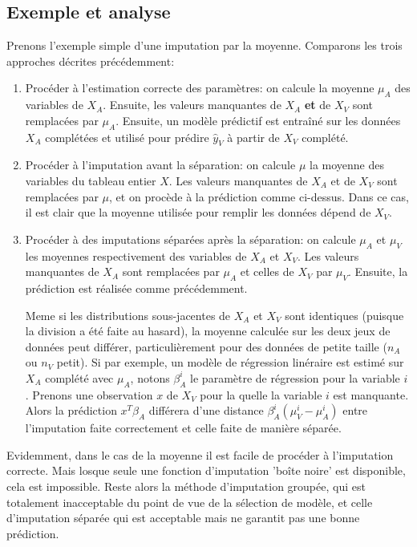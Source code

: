 \documentclass[12pt, a4paper]{article}
\begin{document}
\subsection{Exemple et analyse}
Prenons l'exemple simple d'une imputation par la moyenne. Comparons les trois approches décrites précédemment:
\begin{enumerate}
\item Procéder à l'estimation correcte des paramètres: on calcule la moyenne $\mu_A$ des variables de $X_A$. Ensuite, les valeurs manquantes de $X_A$ \textbf{et} de $X_V$ sont remplacées par $\mu_A$. Ensuite, un modèle prédictif est entraîné sur les données $X_A$ complétées et utilisé pour prédire $\hat{y}_V$ à partir de $X_V$ complété.

\item Procéder à l'imputation avant la séparation: on calcule $\mu$ la moyenne des variables du tableau entier $X$. Les valeurs manquantes de $X_A$ et de $X_V$ sont remplacées par $\mu$, et on procède à la prédiction comme ci-dessus. Dans ce cas, il est clair que la moyenne utilisée pour remplir les données dépend de $X_V$.

\item Procéder à des imputations séparées après la séparation: on calcule $\mu_A$ et $\mu_V$ les moyennes respectivement des variables de $X_A$ et $X_V$. Les valeurs manquantes de $X_A$ sont remplacées par $\mu_A$ et celles de $X_V$ par $\mu_V$. Ensuite, la prédiction est réalisée comme précédemment.

Meme si les distributions sous-jacentes de $X_A$ et $X_V$ sont identiques (puisque la division a été faite au hasard), la moyenne calculée sur les deux jeux de données peut différer, particulièrement pour des données de petite taille ($n_A$ ou $n_V$ petit). Si par exemple, un modèle de régression linéraire est estimé sur $X_A$ complété avec $\mu_A$, notons $\beta_A^i$ le paramètre de régression pour la variable $i$. Prenons une observation $x$  de $X_V$ pour la quelle la variable $i$ est manquante. Alors la prédiction $x^T \beta_A$ différera d'une distance $\beta_A^i (\mu_V^i -\mu_A^i)$ entre l'imputation faite correctement et celle faite de manière séparée.
\end{enumerate}

Evidemment, dans le cas de la moyenne il est facile de procéder à l'imputation correcte. Mais losque seule une fonction d'imputation 'boîte noire' est disponible, cela est impossible. Reste alors la méthode d'imputation groupée, qui est totalement inacceptable du point de vue de la sélection de modèle, et celle d'imputation séparée qui est acceptable mais ne garantit pas une bonne prédiction.
\end{document}
